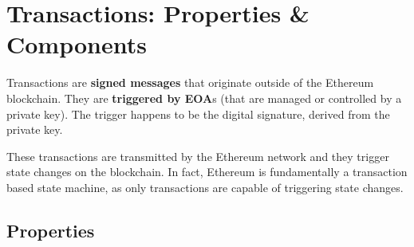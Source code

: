 \section{Transactions: Properties \&
Components}\label{transactions-properties-components}

Transactions are \textbf{signed messages} that originate outside of the
Ethereum blockchain. They are \textbf{triggered by EOA}s (that are
managed or controlled by a private key). The trigger happens to be the
digital signature, derived from the private key.

These transactions are transmitted by the Ethereum network and they
trigger state changes on the blockchain. In fact, Ethereum is
fundamentally a transaction based state machine, as only transactions
are capable of triggering state changes.

\subsection{Properties}\label{properties}

